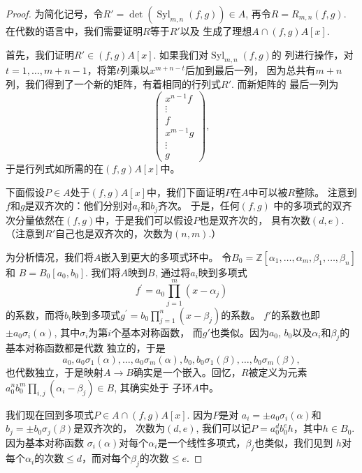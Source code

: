 \begin{proof}
为简化记号，令$R'=\operatorname{det}\left(\operatorname{Syl}_{m, n}(f, g)\right)
\in A$, 再令$R=R_{m,n}(f,g)$. 在代数的语言中，我们需要证明$R$等于$R'$以及
生成了理想$A\cap (f,g)A[x]$.

首先，我们证明$R'\in (f,g)A[x]$. 如果我们对$\operatorname{Syl}_{m, n}(f, g)$的
列进行操作，对$t=1,\dots,m+n-1$，将第$t$列乘以$x^{m+n-t}$后加到最后一列，
因为总共有$m+n$列，我们得到了一个新的矩阵，有着相同的行列式$R'$. 而新矩阵的
最后一列为
\[
    \begin{pmatrix}
        x^{n-1} f \\
        \vdots \\
        f \\
        x^{m-1} g \\
        \vdots \\
        g
    \end{pmatrix},
\]
于是行列式如所需的在$(f,g)A[x]$中。


下面假设$P\in A$处于$(f,g)A[x]$中，我们下面证明$P$在$A$中可以被$R$整除。
注意到$f$和$g$是双齐次的：他们分别对$a_i$和$b_j$齐次。 于是，任何$(f,g)$
中的多项式的双齐次分量依然在$(f,g)$中，于是我们可以假设$P$也是双齐次的，
具有次数$(d,e)$. （注意到$R'$自己也是双齐次的，次数为$(n,m)$.）

为分析情况，我们将$A$嵌入到更大的多项式环中。
令$B_0=\mathbb Z[\alpha_1,\dots,\alpha_m,\beta_1,\dots,\beta_n]$和
$B=B_0[a_0,b_0]$. 我们将$A$映到$B$, 通过将$a_i$映到多项式
\[
    f^{\prime}=a_0 \prod_{j=1}^m(x-\alpha_j)
\]
的系数，而将$b_i$映到多项式$g^{\prime}=b_0 \prod_{j=1}^n(x-\beta_j)$的系数。
$f'$的系数也即$\pm a_0\sigma_i(\alpha)$, 其中$\sigma_i$为第$i$个基本对称函数，
而$g'$也类似。因为$a_0$, $b_0$以及$\alpha_i$和$\beta_j$的基本对称函数都是代数
独立的，于是
\[
    a_0, a_0 \sigma_1(\alpha), \ldots, a_0 \sigma_m(\alpha), b_0, 
    b_0 \sigma_1(\beta), \ldots, b_0 \sigma_m(\beta),
\]
也代数独立，于是映射$A\to B$确实是一个嵌入。回忆，$R$被定义为元素
$a_0^n b_0^m \prod_{i, j}\left(\alpha_i-\beta_j\right) \in B$, 其确实处于
子环$A$中。

我们现在回到多项式$P \in A \cap(f, g) A[x]$. 因为$P$是对
$a_i= \pm a_0 \sigma_i(\alpha)$和$b_j= \pm b_0 \sigma_j(\beta)$是双齐次的，
次数为$(d,e)$, 我们可以记$P=a_0^d b_0^e h$，其中$h\in B_0$. 因为基本对称函数
$\sigma_i(\alpha)$对每个$\alpha_i$是一个线性多项式，$\beta_j$也类似，我们见到
$h$对每个$\alpha_i$的次数$\leq d$，而对每个$\beta_j$的次数$\leq e$.

\nottran

\end{proof}

